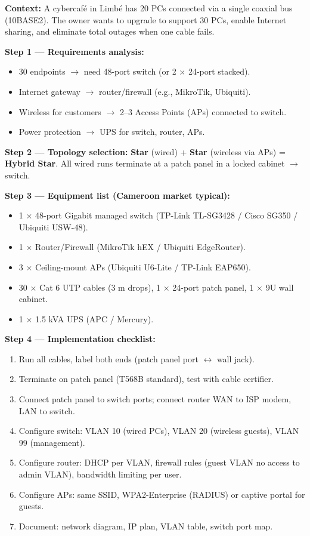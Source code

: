 \documentclass[11pt]{article}
\begin{document}
\begin{experience}
\textbf{Context:} A cybercafé in Limbé has 20 PCs connected via a single coaxial bus (10BASE2). The owner wants to upgrade to support 30 PCs, enable Internet sharing, and eliminate total outages when one cable fails.

\textbf{Step 1 — Requirements analysis:}
\begin{itemize}
\item 30 endpoints $\rightarrow$ need 48-port switch (or 2 $\times$ 24-port stacked).
\item Internet gateway $\rightarrow$ router/firewall (e.g., MikroTik, Ubiquiti).
\item Wireless for customers $\rightarrow$ 2–3 Access Points (APs) connected to switch.
\item Power protection $\rightarrow$ UPS for switch, router, APs.
\end{itemize}

\textbf{Step 2 — Topology selection:} \textbf{Star} (wired) + \textbf{Star} (wireless via APs) = \textbf{Hybrid Star}. All wired runs terminate at a patch panel in a locked cabinet $\rightarrow$ switch.

\textbf{Step 3 — Equipment list (Cameroon market typical):}
\begin{itemize}
\item 1 $\times$ 48-port Gigabit managed switch (TP-Link TL-SG3428 / Cisco SG350 / Ubiquiti USW-48).
\item 1 $\times$ Router/Firewall (MikroTik hEX / Ubiquiti EdgeRouter).
\item 3 $\times$ Ceiling-mount APs (Ubiquiti U6-Lite / TP-Link EAP650).
\item 30 $\times$ Cat 6 UTP cables (3 m drops), 1 $\times$ 24-port patch panel, 1 $\times$ 9U wall cabinet.
\item 1 $\times$ 1.5 kVA UPS (APC / Mercury).
\end{itemize}

\textbf{Step 4 — Implementation checklist:}
\begin{enumerate}
\item Run all cables, label both ends (patch panel port $\leftrightarrow$ wall jack).
\item Terminate on patch panel (T568B standard), test with cable certifier.
\item Connect patch panel to switch ports; connect router WAN to ISP modem, LAN to switch.
\item Configure switch: VLAN 10 (wired PCs), VLAN 20 (wireless guests), VLAN 99 (management).
\item Configure router: DHCP per VLAN, firewall rules (guest VLAN no access to admin VLAN), bandwidth limiting per user.
\item Configure APs: same SSID, WPA2-Enterprise (RADIUS) or captive portal for guests.
\item Document: network diagram, IP plan, VLAN table, switch port map.
\end{enumerate}


\end{experience}
\end{document}
